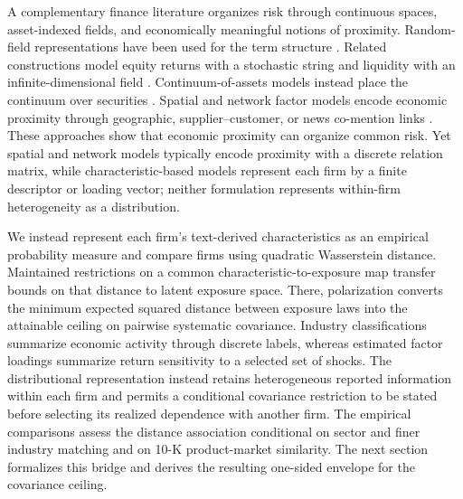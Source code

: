 A complementary finance literature organizes risk through continuous spaces,
asset-indexed fields, and economically meaningful notions of proximity.
Random-field representations have been used for the term structure
\citep{kennedy_term_1994,goldstein_term_2000,santa_clara_sornette_2001}.
Related constructions model equity returns with a stochastic string
\citep{distaso_string_2024} and liquidity with an infinite-dimensional field
\citep{lototsky_liquidity}.
Continuum-of-assets models instead place the continuum over securities
\citep{werner1985,al1995decomposition,khan2001asymptotic}.
Spatial and network factor models encode economic proximity through
geographic, supplier--customer, or news co-mention links
\citep{menzly_market_2010,fernandez_spatial_2011,scherbina_economic_2013,bera_spatial_2016,kou_asset_2018,schwenkler_network_2020,ge_news-implied_2023,gao2025high}.
These approaches show that economic proximity can organize common risk.
Yet spatial and network models typically encode proximity with a discrete
relation matrix, while characteristic-based models represent each firm by a
finite descriptor or loading vector; neither formulation represents within-firm
heterogeneity as a distribution.

We instead represent each firm's text-derived characteristics as an empirical
probability measure and compare firms using quadratic Wasserstein distance.
Maintained restrictions on a common characteristic-to-exposure map transfer
bounds on that distance to latent exposure space.
There, polarization converts the minimum expected squared distance between
exposure laws into the attainable ceiling on pairwise systematic covariance.
Industry classifications summarize economic activity through discrete labels,
whereas estimated factor loadings summarize return sensitivity to a selected
set of shocks.
The distributional representation instead retains heterogeneous reported
information within each firm and permits a conditional covariance restriction
to be stated before selecting its realized dependence with another firm.
The empirical comparisons assess the distance association conditional on
sector and finer industry matching and on 10-K product-market similarity.
The next section formalizes this bridge and derives the resulting one-sided
envelope for the covariance ceiling.
